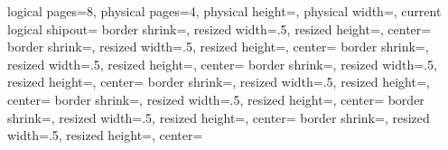 %
{%
  \edef\pgfpageoptionheight{\the\paperwidth} %
  \edef\pgfpageoptionwidth{\the\paperheight}
  \def\pgfpageoptionborder{0pt}
  \def\pgfpageoptionbordercode{}
  \def\pgfpageoptionfirstshipout{1}
}%
{%
  \pgfpagesphysicalpageoptions
  {%
    logical pages=8,%
    physical pages=4,%
    physical height=\pgfpageoptionheight,%
    physical width=\pgfpageoptionwidth,%
    current logical shipout=\pgfpageoptionfirstshipout%
  }
    {%
      border shrink=\pgfpageoptionborder,%
      resized width=.5\pgfphysicalwidth,%
      resized height=\pgfphysicalheight,%
      center=\pgfpoint{.25\pgfphysicalwidth}{.5\pgfphysicalheight}%
    }%
    {%
      border shrink=\pgfpageoptionborder,%
      resized width=.5\pgfphysicalwidth,%
      resized height=\pgfphysicalheight,%
      center=\pgfpoint{.75\pgfphysicalwidth}{.5\pgfphysicalheight}%
    }%
    {%
      border shrink=\pgfpageoptionborder,%
      resized width=.5\pgfphysicalwidth,%
      resized height=\pgfphysicalheight,%
      center=\pgfpoint{.25\pgfphysicalwidth}{.5\pgfphysicalheight}%
    }%
    {%
      border shrink=\pgfpageoptionborder,%
      resized width=.5\pgfphysicalwidth,%
      resized height=\pgfphysicalheight,%
      center=\pgfpoint{.75\pgfphysicalwidth}{.5\pgfphysicalheight}%
    }%
    {%
      border shrink=\pgfpageoptionborder,%
      resized width=.5\pgfphysicalwidth,%
      resized height=\pgfphysicalheight,%
      center=\pgfpoint{.25\pgfphysicalwidth}{.5\pgfphysicalheight}%
    }%
    {%
      border shrink=\pgfpageoptionborder,%
      resized width=.5\pgfphysicalwidth,%
      resized height=\pgfphysicalheight,%
      center=\pgfpoint{.75\pgfphysicalwidth}{.5\pgfphysicalheight}%
    }%
    {%
      border shrink=\pgfpageoptionborder,%
      resized width=.5\pgfphysicalwidth,%
      resized height=\pgfphysicalheight,%
      center=\pgfpoint{.25\pgfphysicalwidth}{.5\pgfphysicalheight}%
    }%
    {%
      border shrink=\pgfpageoptionborder,%
      resized width=.5\pgfphysicalwidth,%
      resized height=\pgfphysicalheight,%
      center=\pgfpoint{.75\pgfphysicalwidth}{.5\pgfphysicalheight}%
    }%
}

